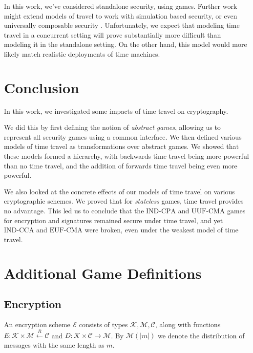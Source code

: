 In this work, we've considered standalone security, using games.
Further work might extend models of travel to work with
simulation based security, or even universally composable security \cite{can01}.
Unfortunately, we expect that modeling time travel in a concurrent setting will prove
substantially more difficult than modeling it in the standalone setting.
On the other hand, this model would more likely match realistic deployments
of time machines.


\section{Conclusion}
In this work, we investigated some impacts of time travel on cryptography.

We did this by first defining the notion of \emph{abstract games},
allowing us to represent all security games using a common interface.
We then defined various models of time travel as transformations over
abstract games.
We showed that these models formed a hierarchy, with backwards
time travel being more powerful than no time travel, and the addition
of forwards time travel being even more powerful.

We also looked at the concrete effects of our models of time travel
on various cryptographic schemes.
We proved that for \emph{stateless} games, time travel provides no
advantage.
This led us to conclude that the $\text{IND-CPA}$ and $\text{UUF-CMA}$
games for encryption and signatures remained secure under time travel,
and yet $\text{IND-CCA}$ and $\text{EUF-CMA}$ were broken,
even under the weakest model of time travel.


{\small }
\clearpage
\appendix

\section{Additional Game Definitions}

\subsection{Encryption}

An encryption scheme $\mathcal{E}$ consists of types $\mathcal{K}, \mathcal{M}, \mathcal{C}$,
along with functions $E : \mathcal{K} \times \mathcal{M} \xleftarrow{R} \mathcal{C}$ and $D : \mathcal{K} \times \mathcal{C} \to \mathcal{M}$.
By $\mathcal{M}(|m|)$ we denote the distribution of messages with the same
length as $m$.

